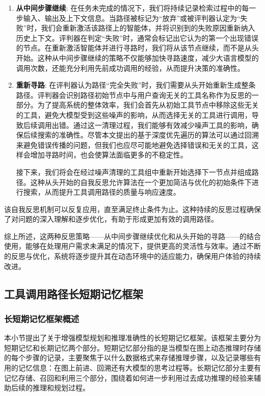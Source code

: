 \begin{enumerate}
  \item \textbf{从中间步骤继续}: 在任务未完成的情况下，我们将持续记录检索过程中的每一步输入、输出及上下文信息。当路径被标记为“放弃”或被评判器认定为“失败”时，我们会重新激活该路径上的智能体，并将识别到的失败原因重新纳入历史上下文。评判器在判定“失败”时，通常会标记出它认为的第一个出现错误的节点。在重新激活智能体并进行寻路时，我们将从该节点继续，而不是从头开始。这种从中间步骤继续的策略不仅能够加快寻路速度，减少大语言模型的调用次数，还能充分利用先前成功调用的经验，从而提升决策的准确性。
  \item \textbf{重新寻路}: 在评判器认为路径“完全失败”时，我们需要从头开始重新生成整条路径。评判器会识别路径初始节点中与用户查询无关的工具名称作为反思的一部分。为了提高系统的整体效率，我们会首先从初始工具节点中移除这些无关的工具，避免大模型受到这些噪声的影响，从而选择无关的工具进行调用，导致后续调用出错。通过这一清理过程，我们能够有效减少噪声工具的影响，确保后续搜索的准确性。尽管本文提出的基于深度优先遍历的算法可以通过回溯来避免错误传播的问题，但我们也应尽可能地避免选择错误和无关的工具，这样会增加寻路时间，也会使算法面临更多的不稳定性。\par
  接下来，我们将会在经过噪声清理的工具组中重新开始选择下一节点并组成路径。这种从头开始的自我反思允许算法在一个更加简洁与优化的初始条件下进行搜索，从而提升工具调用路径的质量与响应速度。
\end{enumerate}
 
该自我反思机制可以反复应用，直至满足终止条件为止。这种持续的反思过程确保了对问题的深入理解和逐步优化，有助于形成更加有效的调用路径。

综上所述，这两种反思策略——从中间步骤继续优化和从头开始的寻路——的结合使用，能够在处理用户需求未满足的情况下，提供更高的灵活性与效率。通过不断的反思与优化，系统将逐步提升其在动态环境中的适应能力，确保用户体验的持续改进。

\subsection{工具调用路径长短期记忆框架}

\subsubsection{长短期记忆框架概述}

本小节提出了关于增强模型规划和推理准确性的长短期记忆框架。该框架主要分为短期记忆和长期记忆两个部分。短期记忆部分指的是当模型在图上动态推理时存储的每个步骤的记录，主要聚焦于以什么数据格式来存储推理步骤，以及记录哪些有用的记忆信息：在图上前进、回溯还有大模型的思考过程等。长期记忆部分主要有记忆存储、召回和利用三个部分，围绕着如何进一步利用过去成功推理的经验来辅助后续的推理和规划过程。

